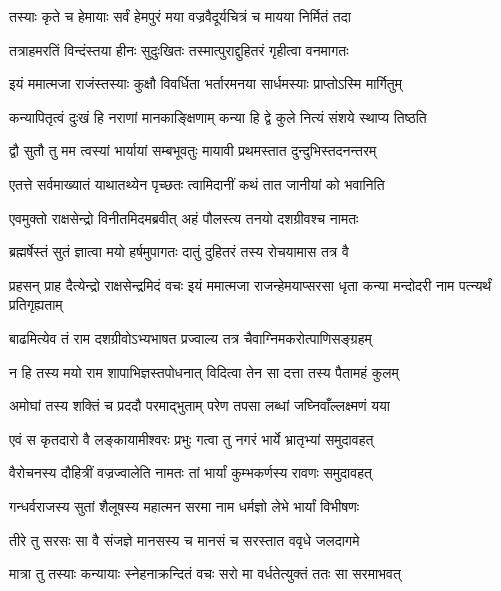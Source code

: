 \twolineshloka
{तस्याः कृते च हेमायाः सर्वं हेमपुरं मया}
{वज्रवैदूर्यचित्रं च मायया निर्मितं तदा} %

\twolineshloka
{तत्राहमरतिं विन्दंस्तया हीनः सुदुःखितः}
{तस्मात्पुराद्दुहितरं गृहीत्वा वनमागतः} %

\twolineshloka
{इयं ममात्मजा राजंस्तस्याः कुक्षौ विवर्धिता}
{भर्तारमनया सार्धमस्याः प्राप्तोऽस्मि मार्गितुम्} %

\twolineshloka
{कन्यापितृत्वं दुःखं हि नराणां मानकाङ्क्षिणाम्}
{कन्या हि द्वे कुले नित्यं संशये स्थाप्य तिष्ठति} %

\twolineshloka
{द्वौ सुतौ तु मम त्वस्यां भार्यायां सम्बभूवतुः}
{मायावी प्रथमस्तात दुन्दुभिस्तदनन्तरम्} %

\twolineshloka
{एतत्ते सर्वमाख्यातं याथातथ्येन पृच्छतः}
{त्वामिदानीं कथं तात जानीयां को भवानिति} %

\twolineshloka
{एवमुक्तो राक्षसेन्द्रो विनीतमिदमब्रवीत्}
{अहं पौलस्त्य तनयो दशग्रीवश्च नामतः} %

\twolineshloka
{ब्रह्मर्षेस्तं सुतं ज्ञात्वा मयो हर्षमुपागतः}
{दातुं दुहितरं तस्य रोचयामास तत्र वै} %

\threelineshloka
{प्रहसन् प्राह दैत्येन्द्रो राक्षसेन्द्रमिदं वचः}
{इयं ममात्मजा राजन्हेमयाप्सरसा धृता}
{कन्या मन्दोदरी नाम पत्न्यर्थं प्रतिगृह्यताम्} %

\twolineshloka
{बाढमित्येव तं राम दशग्रीवोऽभ्यभाषत}
{प्रज्वाल्य तत्र चैवाग्निमकरोत्पाणिसङ्ग्रहम्} %

\twolineshloka
{न हि तस्य मयो राम शापाभिज्ञस्तपोधनात्}
{विदित्वा तेन सा दत्ता तस्य पैतामहं कुलम्} %

\twolineshloka
{अमोघां तस्य शक्तिं च प्रददौ परमाद्भुताम्}
{परेण तपसा लब्धां जघ्निवाँल्लक्ष्मणं यया} %

\twolineshloka
{एवं स कृतदारो वै लङ्कायामीश्वरः प्रभुः}
{गत्वा तु नगरं भार्ये भ्रातृभ्यां समुदावहत्} %

\twolineshloka
{वैरोचनस्य दौहित्रीं वज्रज्वालेति नामतः}
{तां भार्यां कुम्भकर्णस्य रावणः समुदावहत्} %

\twolineshloka
{गन्धर्वराजस्य सुतां शैलूषस्य महात्मन}
{सरमा नाम धर्मज्ञो लेभे भार्यां विभीषणः} %

\twolineshloka
{तीरे तु सरसः सा वै संजज्ञे मानसस्य च}
{मानसं च सरस्तात ववृधे जलदागमे} %

\twolineshloka
{मात्रा तु तस्याः कन्यायाः स्नेहनाक्रन्दितं वचः}
{सरो मा वर्धतेत्युक्तं ततः सा सरमाभवत्} %

